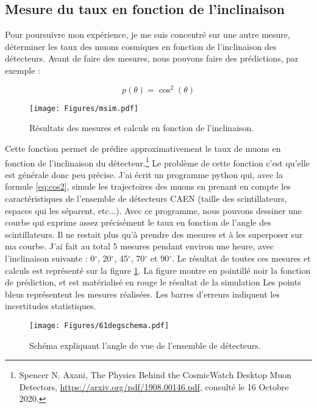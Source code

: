 \documentclass[a4paper, 12pt]{article}
\begin{document}
\begin{spacing}{1.5}
\subsection{Mesure du taux en fonction de l'inclinaison}
\label{sec:TauxInclinaison}

Pour poursuivre mon expérience, je me suis concentré sur une autre mesure,  déterminer les taux des muons cosmiques en fonction de l'inclinaison des détecteurs. Avant de faire des mesures, nous pouvons faire des prédictions, par exemple :

\begin{equation}
p(\theta) = \cos^2(\theta) \label{eq:cos2}
\end{equation}

\begin{figure}[t]
\begin{center}
\texttt{[image: Figures/msim.pdf]}
\caption{\label{fig:msim} Résultats des mesures et calculs en fonction de l'inclinaison.}
\end{center}
\end{figure}

Cette fonction permet de prédire approximativement le taux de muons en fonction de l'inclinaison du détecteur.\footnote{Spencer N. Axani, The Physics Behind the CosmicWatch Desktop Muon Detectors, \url{https://arxiv.org/pdf/1908.00146.pdf}, consulté le 16 Octobre 2020.} Le problème de cette fonction c'est qu'elle est générale donc peu précise. J'ai écrit un programme python qui, avec la formule \ref{eq:cos2}, simule les trajectoires des muons en prenant en compte les caractéristiques de l'ensemble de détecteurs CAEN (taille des scintillateurs, espaces qui les séparent, etc...). Avec ce programme, nous pouvons dessiner une courbe qui exprime assez précisément le taux en fonction de l'angle des scintillateurs. 
Il ne restait plus qu'à prendre des mesures et à les superposer sur ma courbe. J'ai fait au total 5 mesures pendant environ une heure, avec l'inclinaison suivante : 0$^{\circ}$, 20$^{\circ}$, 45$^{\circ}$, 70$^{\circ}$ et 90$^{\circ}$. Le résultat de toutes ces mesures et calculs est représenté sur la figure \ref{fig:msim}. La figure montre en pointillé noir la fonction de prédiction, et est matérialisé en rouge le résultat de la simulation Les points bleus représentent les mesures réalisées. Les barres d'erreurs indiquent les incertitudes statistiques.

\begin{figure}[t]
\begin{center}
\texttt{[image: Figures/61degschema.pdf]}
\caption{\label{fig:61degschema} Schéma expliquant l'angle de vue de l'ensemble de détecteurs.}
\end{center}
\end{figure}



\end{spacing}
\end{document}
